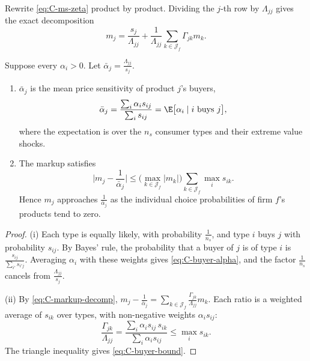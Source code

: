 Rewrite \eqref{eq:C-ms-zeta} product by product. Dividing the $j$-th row by $\Lambda_{jj}$ gives the exact decomposition
\begin{equation}\label{eq:C-markup-decomp}
  m_j = \frac{s_j}{\Lambda_{jj}} + \frac{1}{\Lambda_{jj}}\sum_{k \in \mathcal{J}_f}\Gamma_{jk}m_k .
\end{equation}

\begin{proposition}\label{prop:C-buyer-alpha}
Suppose every $\alpha_i > 0$. Let $\bar\alpha_j = \frac{\Lambda_{jj}}{s_j}$.
\begin{enumerate}[label=(\roman*)]
  \item $\bar\alpha_j$ is the mean price sensitivity of product $j$'s buyers,
  \begin{equation}\label{eq:C-buyer-alpha}
    \bar\alpha_j = \frac{\sum_i\alpha_is_{ij}}{\sum_is_{ij}} = \E\big[\alpha_i \mid i \text{ buys } j\big] ,
  \end{equation}
  where the expectation is over the $n_s$ consumer types and their extreme value shocks.
  \item The markup satisfies
  \begin{equation}\label{eq:C-buyer-bound}
    \Big|m_j - \frac{1}{\bar\alpha_j}\Big| \le \Big(\max_{k \in \mathcal{J}_f}|m_k|\Big)\sum_{k \in \mathcal{J}_f}\max_is_{ik} .
  \end{equation}
  Hence $m_j$ approaches $\frac{1}{\bar\alpha_j}$ as the individual choice probabilities of firm $f$'s products tend to
  zero.
\end{enumerate}
\end{proposition}

\begin{proof}
(i) Each type is equally likely, with probability $\frac{1}{n_s}$, and type $i$ buys $j$ with probability $s_{ij}$. By
Bayes' rule, the probability that a buyer of $j$ is of type $i$ is $\frac{s_{ij}}{\sum_{i'}s_{i'j}}$. Averaging
$\alpha_i$ with these weights gives \eqref{eq:C-buyer-alpha}, and the factor $\frac{1}{n_s}$ cancels from
$\frac{\Lambda_{jj}}{s_j}$.

(ii) By \eqref{eq:C-markup-decomp}, $m_j - \frac{1}{\bar\alpha_j} = \sum_{k \in \mathcal{J}_f}\frac{\Gamma_{jk}}{\Lambda_{jj}}m_k$.
Each ratio is a weighted average of $s_{ik}$ over types, with non-negative weights $\alpha_is_{ij}$:
\begin{equation*}
  \frac{\Gamma_{jk}}{\Lambda_{jj}} = \frac{\sum_i\alpha_is_{ij}\,s_{ik}}{\sum_i\alpha_is_{ij}} \le \max_is_{ik} .
\end{equation*}
The triangle inequality gives \eqref{eq:C-buyer-bound}.
\end{proof}

